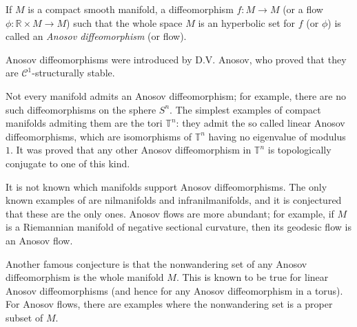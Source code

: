 \documentclass[12pt]{article}
\newcommand{\R}{\mathbb{R}}
\begin{document}
If $M$ is a compact smooth manifold, a diffeomorphism $f\colon M\to M$ (or a flow $\phi\colon\R\times M\to M$) such that the whole space $M$ is an hyperbolic set for $f$ (or $\phi$) is called an \emph{Anosov diffeomorphism} (or flow). 

Anosov diffeomorphisms were introduced by D.V. Anosov, who proved that they are $\mathcal{C}^1$-structurally stable.

Not every manifold admits an Anosov diffeomorphism; for example, there are no such diffeomorphisms on the sphere $S^n$. The simplest examples of compact manifolds admiting them are the tori $\mathbb{T}^n$: they admit the so called linear Anosov diffeomorphisms, which are isomorphisms of $\mathbb{T}^n$ having no eigenvalue of modulus $1$. It was proved that any other Anosov diffeomorphism in $\mathbb{T}^n$ is topologically conjugate to one of this kind. 

It is not known which manifolds support Anosov diffeomorphisms. The only known examples of are nilmanifolds and infranilmanifolds, and it is conjectured that these are the only ones. Anosov flows are more abundant; for example, if $M$ is a Riemannian manifold of negative sectional curvature, then its geodesic flow is an Anosov flow. 

Another famous conjecture is that the nonwandering set of any Anosov diffeomorphism is the whole manifold $M$. This is known to be true for linear Anosov diffeomorphisms (and hence for any Anosov diffeomorphism in a torus). For Anosov flows, there are examples where the nonwandering set is a proper subset of $M$.
\end{document}
